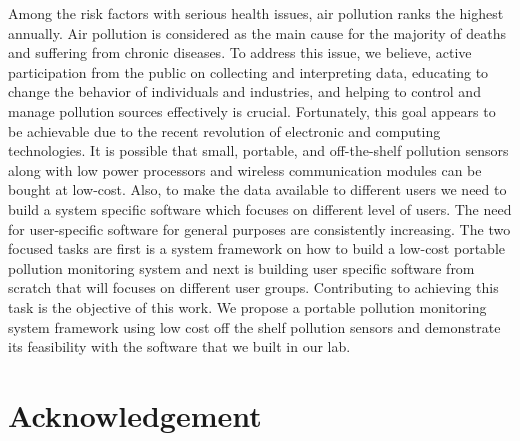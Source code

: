 \documentclass[a4paper,12pt,titlepage,oneside]{report}
\begin{document}
Among the risk factors with serious health issues, air pollution ranks the highest annually. Air pollution is considered as the main cause for the majority of deaths and suffering from chronic diseases. To address this issue, we believe, active participation from the public on collecting and interpreting data, educating to change the behavior of individuals and industries, and helping to control and manage pollution sources effectively is crucial. Fortunately, this goal appears to be achievable due to the recent revolution of electronic and computing technologies. It is possible that small, portable, and off-the-shelf pollution sensors along with low power processors and wireless communication modules can be bought at low-cost. Also, to make the data available to different users we need to build a system specific software which focuses on different level of users. The need for user-specific software for general purposes are consistently increasing. The two focused tasks are first is a  system framework on how to build a low-cost portable pollution monitoring system and next is building user specific software from scratch that will focuses on different user groups.
Contributing to achieving this task is the objective of this work. We propose a portable pollution monitoring system framework using low cost off the shelf pollution sensors and demonstrate its feasibility with the software that we built in our lab.




\newpage
{} %
\tableofcontents

\newpage
{}   %
\listoftables

\newpage
{}   %
\listoffigures

\onehalfspacing
\newpage
{}  %
\section*{Acknowledgement}
\end{document}
